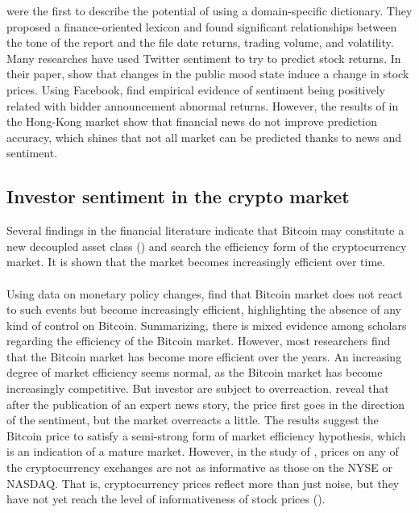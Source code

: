 \documentclass{article}
\begin{document}
	\cite{wialn} were the first to describe the potential of using a domain-specific dictionary. They proposed a finance-oriented lexicon and found significant relationships between the tone of the report and the file date returns, trading volume, and volatility. 
	Many researches have used Twitter sentiment to try to predict stock returns. In their paper, \cite{tmpts} show that changes in the public mood state induce a change in stock prices. Using Facebook, \cite{isaba} find empirical evidence of sentiment being positively related with bidder announcement abnormal returns. However, the results of \cite{niosp} in the Hong-Kong market show that financial news do not improve prediction accuracy, which shines that not all market can be predicted thanks to news and sentiment.
	
	\subsection{Investor sentiment in the crypto market}
	
	Several findings in the financial literature indicate that Bitcoin may constitute a new decoupled asset class (\cite{ocaai}) and search the efficiency form of the cryptocurrency market. It is shown that the market becomes increasingly efficient over time. \\\\
	Using data on monetary policy changes, \cite{sseob} find that Bitcoin market does not react to such events but become increasingly efficient, highlighting the absence of any kind of control on Bitcoin. Summarizing, there is mixed evidence among scholars regarding the efficiency of the Bitcoin market. However, most researchers find that the Bitcoin market has become more efficient over the years. An increasing degree of market efficiency seems normal, as the Bitcoin market has become increasingly competitive. But investor are subject to overreaction. \cite{usatp} reveal that after the publication of an expert news story, the price first goes in the direction of the sentiment, but the market overreacts a little. The results suggest the Bitcoin price to satisfy a semi-strong form of market efficiency hypothesis, which is an indication of a mature market. However, in the study of \cite{nbnpd}, prices on any of the cryptocurrency exchanges are not as informative as those on the NYSE or NASDAQ. That is, cryptocurrency prices reflect more than just noise, but they have not yet reach the level of informativeness of stock prices (\cite{nbnpd}).\\
	
\end{document}

